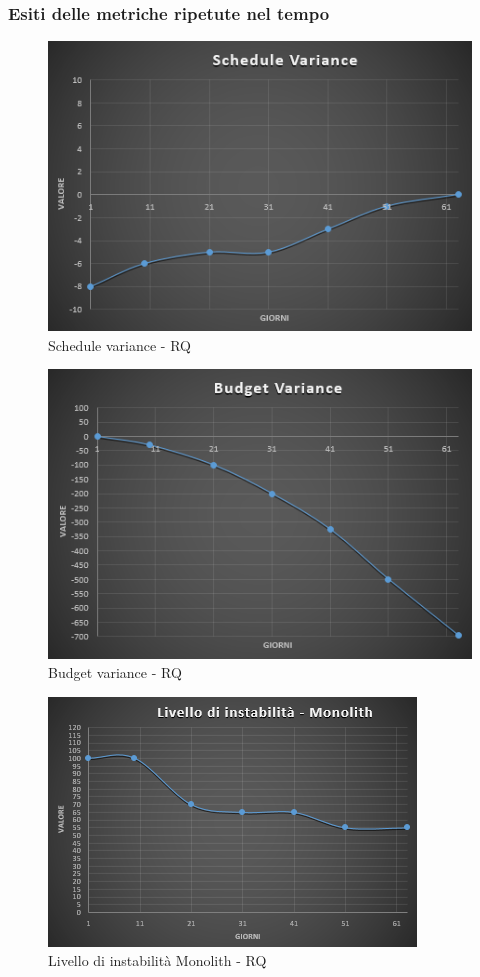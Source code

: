 \subsubsection{Esiti delle metriche ripetute nel tempo}

\begin{figure}[H]
	\centering 
	\includegraphics[scale=0.7]{Sezioni/Immagini/ScheduleVariance-RQ}
	\caption{Schedule variance - RQ}
\end{figure}

\begin{figure}[H]
	\centering 
	\includegraphics[scale=0.7]{Sezioni/Immagini/BudgetVariance-RQ}
	\caption{Budget variance - RQ}
\end{figure}

\begin{figure}[H]
	\centering 
	\includegraphics[scale=0.85]{Sezioni/Immagini/LivelloInstabilitaSDK-RQ}
	\caption{Livello di instabilità Monolith - RQ}
\end{figure}

